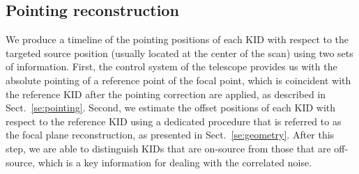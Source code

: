 \subsection{Pointing reconstruction}
\label{se:ptg}
We produce a timeline of the pointing positions of each KID with
respect to the targeted source position (usually located at the center of the
scan) using two sets of information. First, the control system of the
telescope provides us with the absolute pointing of a reference point
of the focal point, which is coincident with the reference KID after
the pointing correction are applied, as described in
Sect.~\ref{se:pointing}. Second, we estimate the offset positions of
each KID with respect to the reference KID using a dedicated
procedure that is referred to as the focal plane reconstruction, as
presented in Sect.~\ref{se:geometry}. After this step, we are able to
distinguish KIDs that are on-source from those that are off-source,
which is a key information for dealing with the correlated noise. 
%
%
